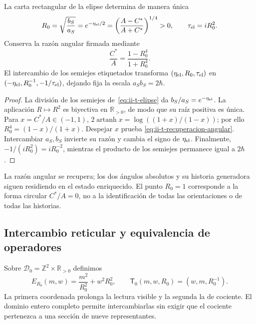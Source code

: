 \begin{proposition}
\label{prop:ii-t-radio}
La carta rectangular de la elipse determina de manera única
\begin{equation}
 R_0=\sqrt{\frac{b_S}{a_S}}
 =e^{-\eta_{\rm el}/2}
 =\left(\frac{A-C^*}{A+C^*}\right)^{1/4}>0,
 \qquad \tau_{\rm el}=iR_0^2.
 \label{eq:ii-t-radio}
\end{equation}
Conserva la razón angular firmada mediante
\begin{equation}
 \frac{C^*}{A}=\frac{1-R_0^4}{1+R_0^4}.
 \label{eq:ii-t-recuperacion-angular}
\end{equation}
El intercambio de los semiejes etiquetados transforma
\((\eta_{\rm el},R_0,\tau_{\rm el})\) en
\((-\eta_{\rm el},R_0^{-1},-1/\tau_{\rm el})\), dejando fija
la escala \(a_Sb_S=2\hbar\).
\end{proposition}

\begin{proof}
La división de los semiejes de~\eqref{eq:ii-t-elipse} da
\(b_S/a_S=e^{-\eta_{\rm el}}\). La aplicación \(R\mapsto R^2\)
es biyectiva en \(\mathbb R_{>0}\), de modo que su raíz positiva es
única. Para \(x=C^*/A\in(-1,1)\),
\(2\operatorname{artanh}x=\log((1+x)/(1-x))\); por ello
\(R_0^4=(1-x)/(1+x)\). Despejar \(x\) prueba
\eqref{eq:ii-t-recuperacion-angular}. Intercambiar \(a_S,b_S\)
invierte su razón y cambia el signo de \(\eta_{\rm el}\). Finalmente,
\(-1/(iR_0^2)=iR_0^{-2}\), mientras el producto de los semiejes
permanece igual a \(2\hbar\).
\end{proof}

La razón angular se recupera; los dos ángulos absolutos y su historia
generadora siguen residiendo en el estado enriquecido. El punto \(R_0=1\)
corresponde a la forma circular \(C^*/A=0\), no a la identificación de
todas las orientaciones o de todas las historias.

\subsection{Intercambio reticular y equivalencia de operadores}

\begin{definition}
\label{def:ii-t-reticular}
Sobre \(\mathscr D_0=\mathbb Z^2\times\mathbb R_{>0}\) definimos
\begin{equation}
 E_{R_0}(m,w)=\frac{m^2}{R_0^2}+w^2R_0^2,\qquad
 \mathsf T_0(m,w,R_0)=(w,m,R_0^{-1}).
 \label{eq:ii-t-energia}
\end{equation}
La primera coordenada prolonga la lectura visible y la segunda la de
cociente. El dominio entero completo permite intercambiarlas sin exigir
que el cociente pertenezca a una sección de nueve representantes.
\end{definition}

